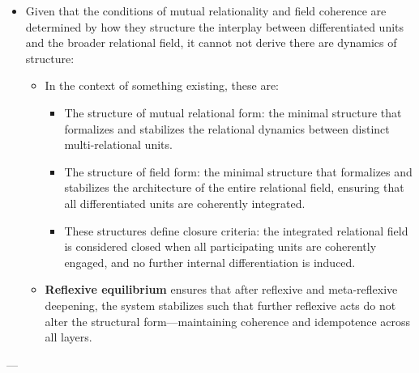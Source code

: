 \documentclass[11pt]{article}
\begin{document}
\begin{itemize}
\item Given that the conditions of mutual relationality and field coherence are determined by how they structure the interplay between differentiated units and the broader relational field, it cannot not derive there are dynamics of structure:

\begin{itemize}
\item In the context of something existing, these are:

\begin{itemize}
\item The structure of mutual relational form: the minimal structure that formalizes and stabilizes the relational dynamics between distinct multi-relational units.

\item The structure of field form: the minimal structure that formalizes and stabilizes the architecture of the entire relational field, ensuring that all differentiated units are coherently integrated.
\item These structures define closure criteria: the integrated relational field is considered closed when all participating units are coherently engaged, and no further internal differentiation is induced.
\end{itemize}
\item \textbf{\textbf{Reflexive equilibrium}} ensures that after reflexive and meta-reflexive deepening, the system stabilizes such that further reflexive acts do not alter the structural form—maintaining coherence and idempotence across all layers.
\end{itemize}
\end{itemize}

---
\end{document}
